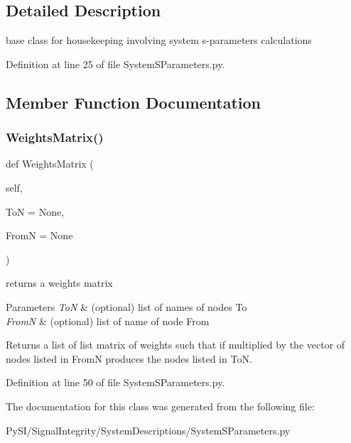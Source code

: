 \subsection{Detailed Description}
base class for housekeeping involving system s-\/parameters calculations 

Definition at line 25 of file System\+S\+Parameters.\+py.



\subsection{Member Function Documentation}
\mbox{\label{classSignalIntegrity_1_1SystemDescriptions_1_1SystemSParameters_1_1SystemSParameters_a60ce3b270f6f66dd0e2fb9f64629f8e6}} 
\subsubsection{\texorpdfstring{Weights\+Matrix()}{WeightsMatrix()}}
{\footnotesize\ttfamily def Weights\+Matrix (\begin{DoxyParamCaption}\item[{}]{self,  }\item[{}]{ToN = {\ttfamily None},  }\item[{}]{FromN = {\ttfamily None} }\end{DoxyParamCaption})\hspace{0.3cm}{\ttfamily [protected]}}



returns a weights matrix 


\begin{DoxyParams}{Parameters}
{\em ToN} & (optional) list of names of nodes To \\
\hline
{\em FromN} & (optional) list of name of node From \\
\hline
\end{DoxyParams}
\begin{DoxyReturn}{Returns}
a list of list matrix of weights such that if multiplied by the vector of nodes listed in FromN produces the nodes listed in ToN. 
\end{DoxyReturn}


Definition at line 50 of file System\+S\+Parameters.\+py.



The documentation for this class was generated from the following file\+:\begin{DoxyCompactItemize}
\item 
Py\+S\+I/\+Signal\+Integrity/\+System\+Descriptions/System\+S\+Parameters.\+py\end{DoxyCompactItemize}
